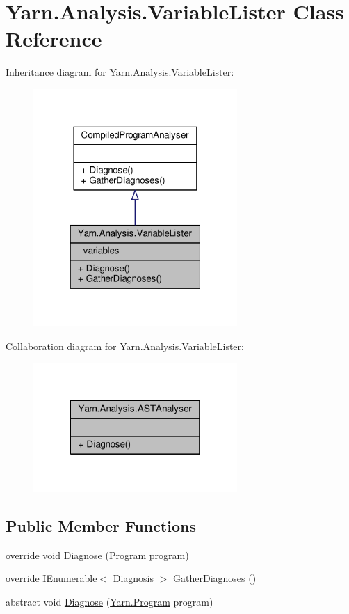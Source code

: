 \hypertarget{a00179}{\section{Yarn.\-Analysis.\-Variable\-Lister Class Reference}
\label{a00179}
}


Inheritance diagram for Yarn.\-Analysis.\-Variable\-Lister\-:
\nopagebreak
\begin{figure}[H]
\begin{center}
\leavevmode
\includegraphics[width=220pt]{a00756}
\end{center}
\end{figure}


Collaboration diagram for Yarn.\-Analysis.\-Variable\-Lister\-:
\nopagebreak
\begin{figure}[H]
\begin{center}
\leavevmode
\includegraphics[width=220pt]{a00757}
\end{center}
\end{figure}
\subsection*{Public Member Functions}
\begin{DoxyCompactItemize}
\item 
override void \hyperlink{a00179_a980f0e64bc5ad171c35ec19bdf838b5c}{Diagnose} (\hyperlink{a00142}{Program} program)
\item 
override I\-Enumerable$<$ \hyperlink{a00081}{Diagnosis} $>$ \hyperlink{a00179_ab84e7a8e68740379dee12a51dca69b07}{Gather\-Diagnoses} ()
\item 
abstract void \hyperlink{a00043_aba4a36cb823b11ee491074e26477d084}{Diagnose} (\hyperlink{a00142}{Yarn.\-Program} program)
\end{DoxyCompactItemize}

